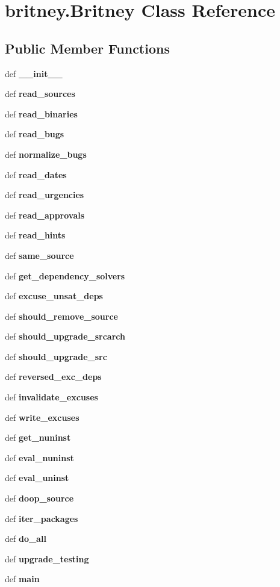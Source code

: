 \section{britney.Britney Class Reference}
\label{classbritney_1_1Britney}
\subsection*{Public Member Functions}
\begin{CompactItemize}
\item 
def \bf{\_\-\_\-init\_\-\_\-}
\item 
def \bf{read\_\-sources}
\item 
def \bf{read\_\-binaries}
\item 
def \bf{read\_\-bugs}
\item 
def \bf{normalize\_\-bugs}
\item 
def \bf{read\_\-dates}
\item 
def \bf{read\_\-urgencies}
\item 
def \bf{read\_\-approvals}
\item 
def \bf{read\_\-hints}
\item 
def \bf{same\_\-source}
\item 
def \bf{get\_\-dependency\_\-solvers}
\item 
def \bf{excuse\_\-unsat\_\-deps}
\item 
def \bf{should\_\-remove\_\-source}
\item 
def \bf{should\_\-upgrade\_\-srcarch}
\item 
def \bf{should\_\-upgrade\_\-src}
\item 
def \bf{reversed\_\-exc\_\-deps}
\item 
def \bf{invalidate\_\-excuses}
\item 
def \bf{write\_\-excuses}
\item 
def \bf{get\_\-nuninst}\label{classbritney_1_1Britney_41c5ee0b9d64b2e76a0c1a1c2b28c73e}

\item 
def \bf{eval\_\-nuninst}\label{classbritney_1_1Britney_e5c18b706e6598474435b1996313cf27}

\item 
def \bf{eval\_\-uninst}\label{classbritney_1_1Britney_b8dd18ead23b6e1126bb4c2a5c3cd8ba}

\item 
def \bf{doop\_\-source}\label{classbritney_1_1Britney_22af61b8a7f6fe71a79d28b5016cae1d}

\item 
def \bf{iter\_\-packages}\label{classbritney_1_1Britney_d453398832baaa7f477f720cfb643029}

\item 
def \bf{do\_\-all}\label{classbritney_1_1Britney_3ef9b6f600eac492fc5aa4b31638198f}

\item 
def \bf{upgrade\_\-testing}
\item 
def \bf{main}
\end{CompactItemize}
